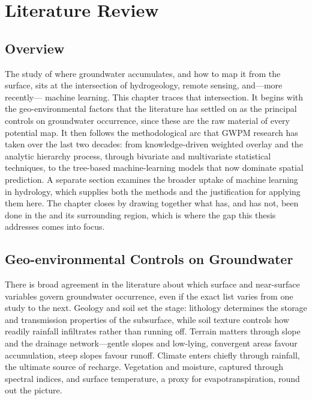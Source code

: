 \chapter{Literature Review}
\label{ch:literature}

\section{Overview}
\label{sec:lit_overview}

The study of where groundwater accumulates, and how to map it from the surface,
sits at the intersection of hydrogeology, remote sensing, and---more recently---
machine learning. This chapter traces that intersection. It begins with the
geo-environmental factors that the literature has settled on as the principal
controls on groundwater occurrence, since these are the raw material of every
potential map. It then follows the methodological arc that GWPM research has
taken over the last two decades: from knowledge-driven weighted overlay and the
analytic hierarchy process, through bivariate and multivariate statistical
techniques, to the tree-based machine-learning models that now dominate spatial
prediction. A separate section examines the broader uptake of machine learning
in hydrology, which supplies both the methods and the justification for applying
them here. The chapter closes by drawing together what has, and has not, been
done in the \studyarea{} and its surrounding region, which is where the gap this
thesis addresses comes into focus.

\section{Geo-environmental Controls on Groundwater}
\label{sec:lit_factors}

There is broad agreement in the literature about which surface and near-surface
variables govern groundwater occurrence, even if the exact list varies from one
study to the next. Geology and soil set the stage: lithology determines the
storage and transmission properties of the subsurface, while soil texture
controls how readily rainfall infiltrates rather than running off. Terrain
matters through slope and the drainage network---gentle slopes and low-lying,
convergent areas favour accumulation, steep slopes favour runoff. Climate enters
chiefly through rainfall, the ultimate source of recharge. Vegetation and
moisture, captured through spectral indices, and surface temperature, a proxy
for evapotranspiration, round out the picture.

